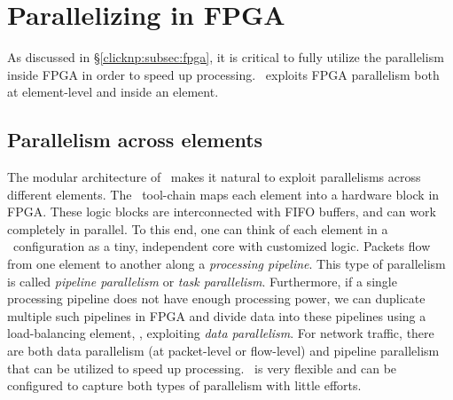 \section{Parallelizing in FPGA}
\label{clicknp:sec:optimization}

As discussed in \S\ref{clicknp:subsec:fpga}, it is critical to fully utilize the parallelism inside FPGA in order to speed up processing.
\name\ exploits FPGA parallelism both at element-level and inside an element.

\subsection{Parallelism across elements}

The modular architecture of \name\ makes it natural to exploit parallelisms across different elements.
The \name\ tool-chain maps each element into a hardware block in FPGA. 
These logic blocks are interconnected with FIFO buffers, and can work completely in parallel.
%
To this end, one can think of each element in a \name\ configuration as a tiny, independent core with customized logic.
Packets flow from one element to another along a \textit{processing pipeline}.
This type of parallelism is called \textit{pipeline parallelism} or \textit{task parallelism}. %
%
Furthermore, if a single processing pipeline does not have enough processing power, we can duplicate multiple such pipelines 
in FPGA and divide data into these pipelines using a load-balancing element, \ie, exploiting \textit{data parallelism}. %
For network traffic, there are both data parallelism (at packet-level or flow-level)
and pipeline parallelism that can be utilized  to speed up processing.
\name\ is very flexible and can be configured to capture both types of parallelism with little efforts.


